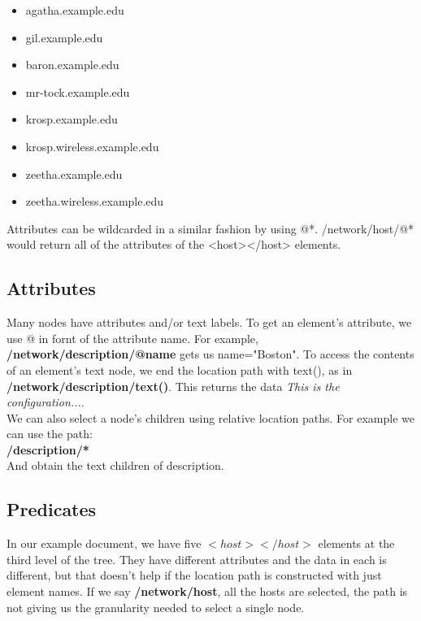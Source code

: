 \begin{itemize}
\item agatha.example.edu
\item gil.example.edu
\item baron.example.edu
\item mr-tock.example.edu
\item krosp.example.edu
\item krosp.wireless.example.edu
\item zeetha.example.edu
\item zeetha.wireless.example.edu
\end{itemize}

Attributes can be wildcarded in a similar fashion by using @*. /network/host/@* would return all of the attributes of the <host></host> elements.\\

\subsection{Attributes}

Many nodes have attributes and/or text labels. To get an element's attribute, we use @ in fornt of the attribute name. For example, \textbf{/network/description/@name} gets us name="Boston". To access the contents of an element’s text node, we end the location path with text(), as in \textbf{/network/description/text()}. This returns the data \textit{This is the configuration...}.\\

We can also select a node's children using relative location paths. For example we can use the path:\\

\textbf{/description/*}\\

And obtain the text children of description.\\

\subsection{Predicates}

In our example document, we have five $<host></host>$ elements at the third level of the tree. They have different attributes and the data in each is different, but that doesn’t help if the location path is constructed with just element names. If we say \textbf{/network/host}, all the hosts are selected, the path is not giving us the granularity needed to select a single node.\\

